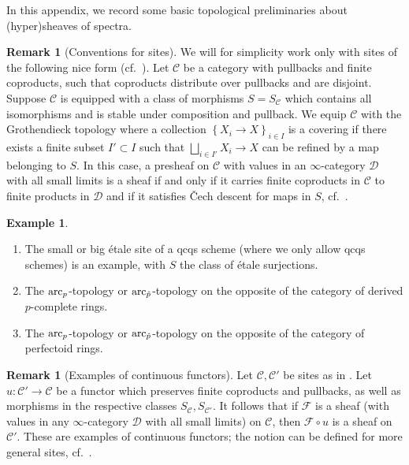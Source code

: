 \documentclass{amsart}
\newcommand{\sF}{\mathcal{F}}
\theoremstyle{definition}
\newtheorem{example}[theorem]{Example}
\newtheorem{remark}[theorem]{Remark}
\begin{document}
In this appendix, we record some basic topological preliminaries about
(hyper)sheaves of spectra. 



\begin{remark}[Conventions for sites] 
We will for simplicity work only with 
sites of the following nice form (cf.~\cite[Sec.~A.3.2]{SAG}). 
Let $\mathcal{C}$ be a category with pullbacks and finite coproducts, 
such that coproducts distribute over pullbacks and are disjoint. Suppose $\mathcal{C}$ is
equipped with a class of morphisms $S = S_{\mathcal{C}}$ which contains all
isomorphisms and is
stable under composition and pullback. 
We equip $\mathcal{C}$ with the Grothendieck topology where 
a collection $\left\{X_i \to X\right\}_{i \in I}$ is a covering if  there exists
a finite subset $I' \subset I$ such that $\bigsqcup_{i \in I'} X_i \to X$
can be refined by a map belonging to $S$. 
In this case, a presheaf on $\mathcal{C}$ with values in an $\infty$-category
$\mathcal{D}$ with all small limits is a sheaf if and only if it 
carries finite coproducts in $\mathcal{C}$ to finite products in $\mathcal{D}$
and if it satisfies \v{C}ech descent for maps in $S$, cf.~\cite[Sec.~A.3.3]{SAG}. 
\label{convsite}
\end{remark} 

\begin{example} 
\begin{enumerate}
\item The small or big \'etale site of a qcqs scheme (where we only allow
qcqs schemes) is an example, with $S$ the class of \'etale surjections. 
\item The $\mathrm{arc}_{{p}}$-topology or $\mathrm{arc}_{\hat{p}}$-topology on the opposite of the category of derived
$p$-complete rings. 
\item The $\mathrm{arc}_{{p}}$-topology or $\mathrm{arc}_{\hat{p}}$-topology on the opposite of the category of perfectoid
rings. 
\end{enumerate}
\end{example} 

\begin{remark}[Examples of continuous functors] 
Let $\mathcal{C}, \mathcal{C}'$ be sites as in . 
Let $u \colon \mathcal{C}' \to \mathcal{C}$ be a 
functor which preserves finite coproducts and pullbacks, as well as morphisms
in the respective classes $S_{\mathcal{C}}, S_{\mathcal{C}'}$. 
It follows that if $\sF$ is a sheaf (with values in any $\infty$-category
$\mathcal{D}$ with all small limits) on $\mathcal{C}$, then $\sF \circ u$ is a
sheaf on $\mathcal{C}'$. 
These are examples of continuous functors; the notion can be defined for more
general sites, cf.~\cite[Exp.~III.1]{SGA4}. 
\label{exofcontfunctor}
\end{remark} 
\end{document}

